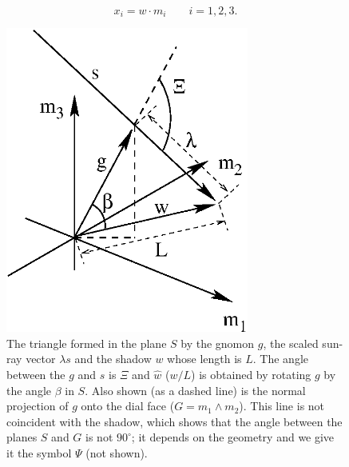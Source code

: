 \documentclass[12pt]{article}
\newcommand{\dt}{\! \cdot \!}
\newcommand{\wdg}{\! \wedge \!}
\newcommand{\what}{\hat{w}}
\begin{document}
%
\begin{equation} \label{cartCoordsShad}
x_i = w \dt m_i \qquad i = 1, 2, 3.
\end{equation}
%
\begin{figure}
\centering
\includegraphics[width=8cm]{figs/figure5.eps}
\caption{The triangle formed in the plane $S$ by the gnomon $g$, the scaled sun-ray vector $\lambda s$ and the shadow $w$ whose length is $L$. The angle between the $g$ and $s$ is $\Xi$ and $\what$ ($w/L$) is obtained by rotating $g$ by the angle $\beta$ in $S$. Also shown (as a dashed line) is the normal projection of $g$ onto the dial face ($G = m_1 \wdg m_2$). This line is not coincident with the shadow, which shows that the angle between the planes $S$ and $G$ is not $90^\circ$; it depends on the geometry and we give it the symbol $\Psi$ (not shown).\label{shadTriangle}}
\end{figure}
%
\end{document}
